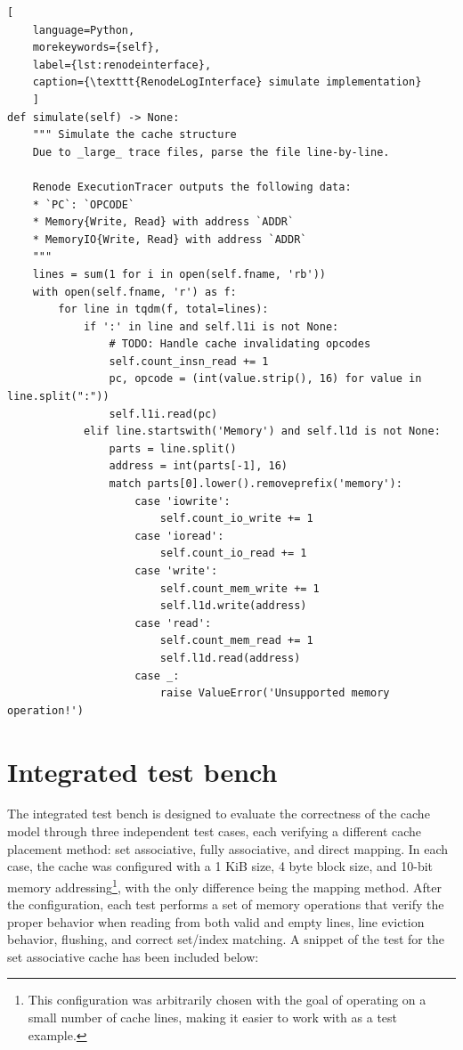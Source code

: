 \begin{center}
\centering
\begin{minipage}{\linewidth}
\begin{lstlisting}[
    language=Python,
	morekeywords={self},
    label={lst:renodeinterface},
    caption={\texttt{RenodeLogInterface} simulate implementation}
    ]
def simulate(self) -> None:
    """ Simulate the cache structure
    Due to _large_ trace files, parse the file line-by-line.

    Renode ExecutionTracer outputs the following data:
    * `PC`: `OPCODE`
    * Memory{Write, Read} with address `ADDR`
    * MemoryIO{Write, Read} with address `ADDR`
    """
    lines = sum(1 for i in open(self.fname, 'rb'))
    with open(self.fname, 'r') as f:
        for line in tqdm(f, total=lines):
            if ':' in line and self.l1i is not None:
                # TODO: Handle cache invalidating opcodes
                self.count_insn_read += 1
                pc, opcode = (int(value.strip(), 16) for value in line.split(":"))
                self.l1i.read(pc)
            elif line.startswith('Memory') and self.l1d is not None:
                parts = line.split()
                address = int(parts[-1], 16)
                match parts[0].lower().removeprefix('memory'):
                    case 'iowrite':
                        self.count_io_write += 1
                    case 'ioread':
                        self.count_io_read += 1
                    case 'write':
                        self.count_mem_write += 1
                        self.l1d.write(address)
                    case 'read':
                        self.count_mem_read += 1
                        self.l1d.read(address)
                    case _:
                        raise ValueError('Unsupported memory operation!')
\end{lstlisting}
\end{minipage}
\end{center}

\section{Integrated test bench}
The integrated test bench is designed to evaluate the correctness of the cache model through three independent test cases, each verifying a different cache placement method:
set associative, fully associative, and direct mapping. In each case, the cache was configured with a 1 KiB size, 4 byte block size, and 10-bit memory addressing\footnote{This
configuration was arbitrarily chosen with the goal of operating on a small number of cache lines, making it easier to work with as a test example.}, with the only difference
being the mapping method. After the configuration, each test performs a set of memory operations that verify the proper behavior when reading from both valid and empty lines, line
eviction behavior, flushing, and correct set/index matching. A snippet of the test for the set associative cache has been included below:

